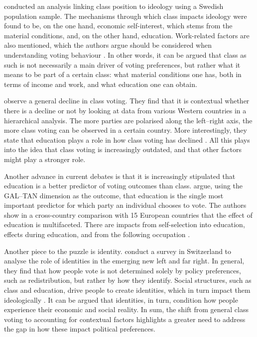 \documentclass[stu,12pt]{apa7}
\begin{document}
\textcite{bengtssonClassIdeologicalOrientations2013a} conducted an analysis linking class position to ideology using a Swedish population sample. The mechanisms through which class impacts ideology were found to be, on the one hand, economic self-interest, which stems from the material conditions, and, on the other hand, education. Work-related factors are also mentioned, which the authors argue should be considered when understanding voting behaviour \parencite{bengtssonClassIdeologicalOrientations2013a}. In other words, it can be argued that class as such is not necessarily a main driver of voting preferences, but rather what it means to be part of a certain class: what material conditions one has, both in terms of income and work, and what education one can obtain.

\textcite{jansenClassVotingLeft2013} observe a general decline in class voting. They find that it is contextual whether there is a decline or not by looking at data from various Western countries in a hierarchical analysis. The more parties are polarised along the left–right axis, the more class voting can be observed in a certain country. More interestingly, they state that education plays a role in how class voting has declined \parencite{jansenClassVotingLeft2013}. All this plays into the idea that class voting is increasingly outdated, and that other factors might play a stronger role.

Another advance in current debates is that it is increasingly stipulated that education is a better predictor of voting outcomes than class. \textcite{hoogheFieldEducationPolitical2025} argue, using the GAL–TAN dimension as the outcome, that education is the single most important predictor for which party an individual chooses to vote. The authors show in a cross-country comparison with 15 European countries that the effect of education is multifaceted. There are impacts from self-selection into education, effects during education, and from the following occupation \parencite{hoogheFieldEducationPolitical2025}.

Another piece to the puzzle is identity. \textcite{bornschierHowUsThem2021b} conduct a survey in Switzerland to analyse the role of identities in the emerging new left and far right. In general, they find that how people vote is not determined solely by policy preferences, such as redistribution, but rather by how they identify. Social structures, such as class and education, drive people to create identities, which in turn impact them ideologically \parencite{bornschierHowUsThem2021b}. It can be argued that identities, in turn, condition how people experience their economic and social reality. In sum, the shift from general class voting to accounting for contextual factors highlights a greater need to address the gap in how these impact political preferences.
\end{document}
